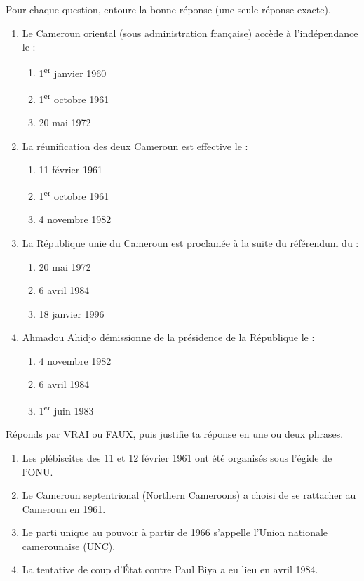 \documentclass[11pt]{article}
\begin{document}
\begin{exercice}
Pour chaque question, entoure la bonne réponse (une seule réponse exacte).
\begin{enumerate}
\item Le Cameroun oriental (sous administration française) accède à l'indépendance le :
\begin{enumerate}
\item 1\textsuperscript{er} janvier 1960 \item 1\textsuperscript{er} octobre 1961 \item 20 mai 1972
\end{enumerate}
\item La réunification des deux Cameroun est effective le :
\begin{enumerate}
\item 11 février 1961 \item 1\textsuperscript{er} octobre 1961 \item 4 novembre 1982
\end{enumerate}
\item La République unie du Cameroun est proclamée à la suite du référendum du :
\begin{enumerate}
\item 20 mai 1972 \item 6 avril 1984 \item 18 janvier 1996
\end{enumerate}
\item Ahmadou Ahidjo démissionne de la présidence de la République le :
\begin{enumerate}
\item 4 novembre 1982 \item 6 avril 1984 \item 1\textsuperscript{er} juin 1983
\end{enumerate}
\end{enumerate}
\end{exercice}

\begin{exercice}
Réponds par VRAI ou FAUX, puis justifie ta réponse en une ou deux phrases.
\begin{enumerate}
\item Les plébiscites des 11 et 12 février 1961 ont été organisés sous l'égide de l'ONU.
\item Le Cameroun septentrional (Northern Cameroons) a choisi de se rattacher au Cameroun en 1961.
\item Le parti unique au pouvoir à partir de 1966 s'appelle l'Union nationale camerounaise (UNC).
\item La tentative de coup d'État contre Paul Biya a eu lieu en avril 1984.
\end{enumerate}
\end{exercice}
\end{document}
